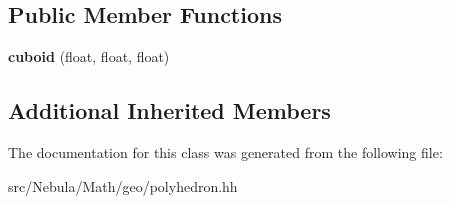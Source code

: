 \subsection*{Public Member Functions}
\begin{DoxyCompactItemize}
\item 
\hypertarget{classmath_1_1geo_1_1cuboid_a72bd7e6bf32ccd6928e375efa3036491}{{\bfseries cuboid} (float, float, float)}\label{classmath_1_1geo_1_1cuboid_a72bd7e6bf32ccd6928e375efa3036491}

\end{DoxyCompactItemize}
\subsection*{Additional Inherited Members}


The documentation for this class was generated from the following file\-:\begin{DoxyCompactItemize}
\item 
src/\-Nebula/\-Math/geo/polyhedron.\-hh\end{DoxyCompactItemize}
